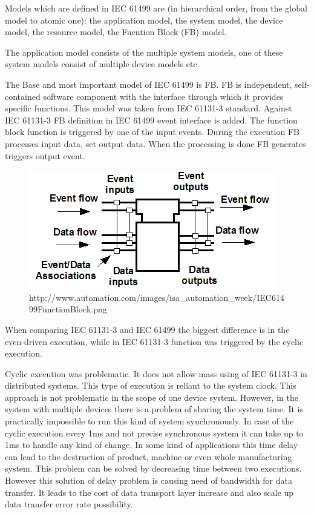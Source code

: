 Models which are defined in IEC 61499 are (in hierarchical order, from the global model to atomic one): the application model, the system model, the device model, the resource model, the Fucntion Block (FB) model.

The application model consists of the multiple system models, one of these system models consist of multiple device models etc. 

The Base and most important model of IEC 61499 is FB. FB is independent, self-contained software component with the interface through which it provides specific functions. This model was taken from IEC 61131-3 standard. Against IEC 61131-3 FB definition in IEC 61499 event interface is added. The function block function is triggered by one of the input events. During the execution FB processes input data, set output data. When the processing is done FB generates triggers output event. 

\begin{figure}
\centering
\includegraphics{Figures/IEC61499FunctionBlock}
\decoRule
\caption[IEC 61499 Function Block]{http://www.automation.com/images/isa_automation_week/IEC61499FunctionBlock.png}
\label{fig:IEC61499FunctionBlock}
\end{figure}
 

When comparing IEC 61131-3 and IEC 61499 the biggest difference is in the even-driven execution, while in IEC 61131-3 function was triggered by the cyclic execution.

Cyclic execution was problematic. It does not allow mass using of IEC 61131-3 in distributed systems. This type of execution is 	reliant to the system clock. This approach is not problematic in the scope of one device system. However, in the system with multiple devices there is a problem of sharing the system time. It is practically impossible to run this kind of system synchronously.
In case of the cyclic execution every 1ms and not precise synchronous system it can take up to 1ms to handle any kind of change. In some kind of applications this time delay can lead to the destruction of product, machine or even whole manufacturing system. 
This problem can be solved by decreasing time between two executions. However this solution of delay problem is causing need of bandwidth for data transfer. It leads to the cost of data transport layer increase and also scale up data transfer error rate possibility. 

